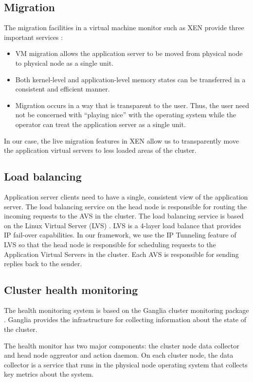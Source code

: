 \documentclass[times, 10pt,twocolumn]{article}
\begin{document}
\subsection{Migration}
\label{sec:migration}
The migration facilities in a virtual machine monitor such as XEN provide
three important services \cite{Clark2005}:
\begin{itemize}
\item VM migration allows the application server to be moved from physical
  node to physical node as a single unit.
\item Both kernel-level and application-level memory states can be transferred
  in a consistent and efficient manner.
\item Migration occurs in a way that is transparent to the user.  Thus, the
  user need not be concerned with ``playing nice'' with the operating system
  while the operator can treat the application server as a single unit.
\end{itemize}

In our case, the live migration features in XEN allow us to transparently move
the application virtual servers to less loaded areas of the cluster.

\subsection{Load balancing}
\label{sec:loadbalance}
Application server clients need to have a single, consistent view of the
application server.  The load balancing service on the head node is
responsible for routing the incoming requests to the AVS in the cluster. The
load balancing service is based on the Linux Virtual Server (LVS)
\cite{LVS2006} \cite{Zha2000}.  LVS is a 4-layer load balance that provides IP
fail-over capabilities.  In our framework, we use the IP Tunneling feature of
LVS so that the head node is responsible for scheduling requests to the
Application Virtual Servers in the cluster.  Each AVS is responsible for
sending replies back to the sender.

\subsection{Cluster health monitoring}
\label{sec:health}
The health monitoring system is based on the Ganglia cluster monitoring
package \cite{Ganglia2003}.  Ganglia provides the infrastructure for
collecting information about the state of the cluster.

The health monitor has two major components: the cluster node data collector
and head node aggreator and action daemon. On each cluster node, the data
collector is a service that runs in the physical node operating system that
collects key metrics about the system.   
\end{document}

